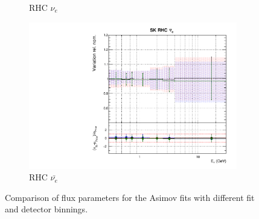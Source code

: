 \begin{figure}[!htbp]
\begin{subfigure}{0.45\textwidth}
  \caption{\SK RHC $\nu_{e}$}
\end{subfigure}
\begin{subfigure}{0.45\textwidth}
  \centering
  \includegraphics[width=0.75\linewidth]{figs/polyasmvsflux_15}
  \caption{\SK RHC $\bar{\nu_e}$}
\end{subfigure}
\caption{Comparison of \SK flux parameters for the Asimov fits with different fit and detector binnings.}
\label{fig:polyasmvsfluxSKapp}
\end{figure}

